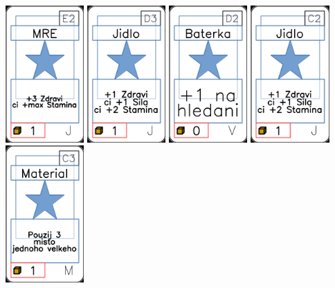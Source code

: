 \documentclass[a4paper]{article}
\begin{document}
	\includegraphics[width=3.0cm]{img-1_21}
	\includegraphics[width=3.0cm]{img-1_17}
	\includegraphics[width=3.0cm]{img-1_76}
	\includegraphics[width=3.0cm]{img-1_11}
	\includegraphics[width=3.0cm]{img-1_42}
\end{document}
